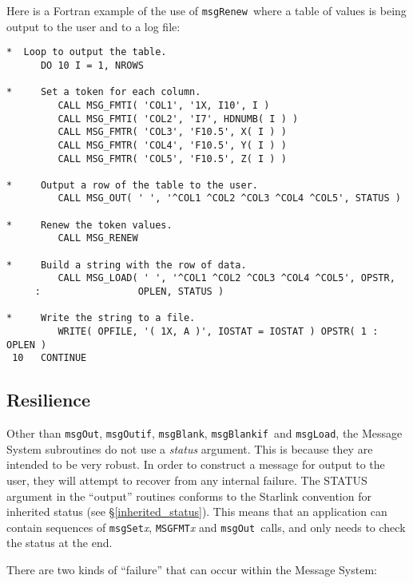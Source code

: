 \documentclass[twoside,11pt]{article}
\newcommand{\htmlref}[2]{#1}
\newcommand{\latex}[1]{#1}
\newcommand{\xlabel}[1]{}
\renewcommand{\_}{\texttt{\symbol{95}}}
\newcommand{\func}[1]{\texttt{#1}}
\newcommand{\farg}[1]{\textit{#1}}
\newcommand{\msgblank}{\func{msgBlank}}
\newcommand{\msgblankif}{\func{msgBlankif}}
\newcommand{\msgload}{\func{msgLoad}}
\newcommand{\msgout}{\func{msgOut}}
\newcommand{\msgoutif}{\func{msgOutif}}
\newcommand{\msgrenew}{\func{msgRenew}}
\begin{document}
Here is a Fortran example of the use of \msgrenew\ where a table of values is being
output to the user and to a log file:

\begin {small}
\begin{verbatim}
*  Loop to output the table.
      DO 10 I = 1, NROWS

*     Set a token for each column.
         CALL MSG_FMTI( 'COL1', '1X, I10', I )
         CALL MSG_FMTI( 'COL2', 'I7', HDNUMB( I ) )
         CALL MSG_FMTR( 'COL3', 'F10.5', X( I ) )
         CALL MSG_FMTR( 'COL4', 'F10.5', Y( I ) )
         CALL MSG_FMTR( 'COL5', 'F10.5', Z( I ) )

*     Output a row of the table to the user.
         CALL MSG_OUT( ' ', '^COL1 ^COL2 ^COL3 ^COL4 ^COL5', STATUS )

*     Renew the token values.
         CALL MSG_RENEW

*     Build a string with the row of data.
         CALL MSG_LOAD( ' ', '^COL1 ^COL2 ^COL3 ^COL4 ^COL5', OPSTR,
     :                 OPLEN, STATUS )

*     Write the string to a file.
         WRITE( OPFILE, '( 1X, A )', IOSTAT = IOSTAT ) OPSTR( 1 : OPLEN )
 10   CONTINUE
\end{verbatim}
\end {small}


\subsection{\xlabel{resilience}Resilience}

Other than \msgout, \msgoutif, \msgblank, \msgblankif\ and \msgload, the Message System 
subroutines do not use a \farg{status} argument. 
This is because they are intended to be very robust.
In order to construct a message for output to the user, they will attempt to 
recover from any internal failure. 
The STATUS argument in the ``output'' routines conforms to the Starlink
convention for 
\htmlref
{inherited status}{inherited_status}\latex{ (see \S\ref{inherited_status})}.
This means that an application can contain sequences of \func{msgSet}\textit{x}, 
\func{MSG\_FMT}\textit{x} and \msgout\ calls, and only needs to check the status at the 
end.

There are two kinds of ``failure'' that can occur within the Message
System:
\end{document}
